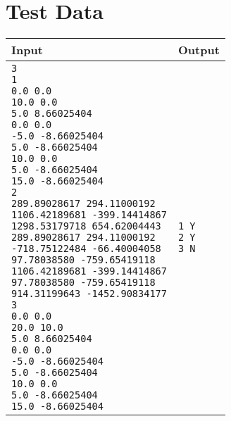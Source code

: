 \documentclass[11pt]{article}
\begin{document}
\section{Test Data}
\begin{tabularx}{\textwidth}{|X|X|}
	\hline
	Input & Output \\ \hline
	\parbox[t]{5cm}{
	\texttt{3\\
			1\\
			0.0 0.0\\
			10.0 0.0\\
			5.0 8.66025404\\
			0.0 0.0\\
			-5.0 -8.66025404\\
			5.0 -8.66025404\\
			10.0 0.0\\
			5.0 -8.66025404\\
			15.0 -8.66025404\\
			2\\
			289.89028617 294.11000192\\
			1106.42189681 -399.14414867\\
			1298.53179718 654.62004443\\
			289.89028617 294.11000192\\
			-718.75122484 -66.40004058\\
			97.78038580 -759.65419118\\
			1106.42189681 -399.14414867\\
			97.78038580 -759.65419118\\
			914.31199643 -1452.90834177\\
			3\\
			0.0 0.0\\
			20.0 10.0\\
			5.0 8.66025404\\
			0.0 0.0\\
			-5.0 -8.66025404\\
			5.0 -8.66025404\\
			10.0 0.0\\
			5.0 -8.66025404\\
			15.0 -8.66025404\\
	}} &
	\parbox[t]{5cm}{
	\texttt{1 Y\\
			2 Y\\
			3 N\\
	}}\\
	\hline
\end{tabularx}
\end{document}
